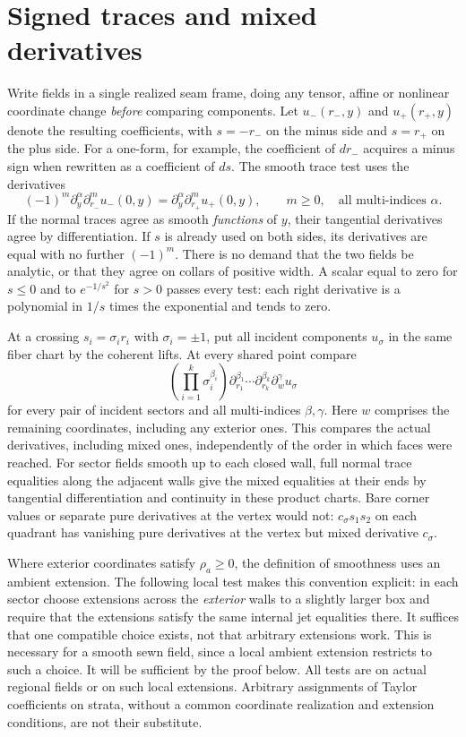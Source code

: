 \section{Signed traces and mixed derivatives}

Write fields in a single realized seam frame, doing any tensor, affine or nonlinear coordinate change \emph{before} comparing components. Let $u_-(r_-,y)$ and $u_+(r_+,y)$ denote the resulting coefficients, with $s=-r_-$ on the minus side and $s=r_+$ on the plus side. For a one-form, for example, the coefficient of $dr_-$ acquires a minus sign when rewritten as a coefficient of $ds$. The smooth trace test uses the derivatives
\begin{equation}
 (-1)^m\partial_y^\alpha\partial_{r_-}^m u_-(0,y)
   =\partial_y^\alpha\partial_{r_+}^m u_+(0,y),
 \qquad m\geq0,\quad\text{all multi-indices }\alpha .\label{eq:03-jet}
\end{equation}
If the normal traces agree as smooth \emph{functions} of $y$, their tangential derivatives agree by differentiation. If $s$ is already used on both sides, its derivatives are equal with no further $(-1)^m$. There is no demand that the two fields be analytic, or that they agree on collars of positive width. A scalar equal to zero for $s\leq0$ and to $e^{-1/s^2}$ for $s>0$ passes every test: each right derivative is a polynomial in $1/s$ times the exponential and tends to zero.

At a crossing $s_i=\sigma_i r_i$ with $\sigma_i=\pm1$, put all incident components $u_\sigma$ in the same fiber chart by the coherent lifts. At every shared point compare
\[
 \left(\prod_{i=1}^k \sigma_i^{\beta_i}\right)
 \partial_{r_1}^{\beta_1}\cdots\partial_{r_k}^{\beta_k}
 \partial_w^\gamma u_\sigma
\]
for every pair of incident sectors and all multi-indices $\beta,\gamma$. Here $w$ comprises the remaining coordinates, including any exterior ones. This compares the actual derivatives, including mixed ones, independently of the order in which faces were reached. For sector fields smooth up to each closed wall, full normal trace equalities along the adjacent walls give the mixed equalities at their ends by tangential differentiation and continuity in these product charts. Bare corner values or separate pure derivatives at the vertex would not: $c_\sigma s_1s_2$ on each quadrant has vanishing pure derivatives at the vertex but mixed derivative $c_\sigma$.

Where exterior coordinates satisfy $\rho_a\geq0$, the definition of smoothness uses an ambient extension. The following local test makes this convention explicit: in each sector choose extensions across the \emph{exterior} walls to a slightly larger box and require that the extensions satisfy the same internal jet equalities there. It suffices that one compatible choice exists, not that arbitrary extensions work. This is necessary for a smooth sewn field, since a local ambient extension restricts to such a choice. It will be sufficient by the proof below. All tests are on actual regional fields or on such local extensions. Arbitrary assignments of Taylor coefficients on strata, without a common coordinate realization and extension conditions, are not their substitute.

